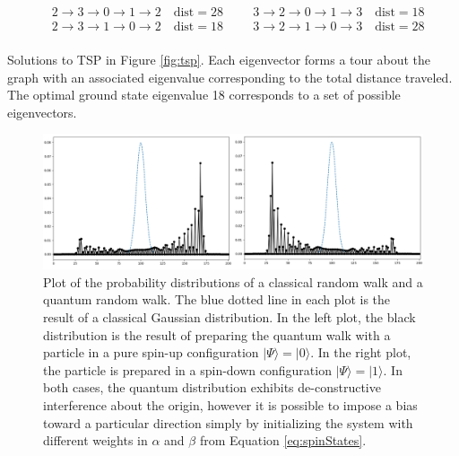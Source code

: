 \begin{table}[h]
\[\begin{split}
			&2 \rightarrow 3 \rightarrow 0 \rightarrow 1 \rightarrow 2 \quad \text{dist}=28 \hspace{1cm} 3 \rightarrow 2 \rightarrow 0 \rightarrow 1 \rightarrow 3 \quad \text{dist}=18\\
			&2 \rightarrow 3 \rightarrow 1 \rightarrow 0 \rightarrow 2 \quad \text{dist}=18 \hspace{1cm} 3 \rightarrow 2 \rightarrow 1 \rightarrow 0 \rightarrow 3 \quad \text{dist}=28\\
		\end{split}
		\]
		\caption{\doublespacing Solutions to TSP in Figure \ref{fig:tsp}. 
			Each eigenvector forms a tour about the graph with an associated eigenvalue corresponding to the total distance traveled. 
			The optimal ground state eigenvalue 18 corresponds to a set of possible eigenvectors.}
		\label{tab:eigenset}
	\end{table}
\vspace{-0.5cm}
		\begin{figure}[H]
				\includegraphics[width=16cm]{images/bias}
			\caption{\doublespacing Plot of the probability distributions of a classical random walk and a quantum random walk. 
				The blue dotted line in each plot is the result of a classical Gaussian distribution. 
				In the left plot, the black distribution is the result of preparing the quantum walk with a particle in a pure spin-up configuration $|\Psi\rangle = |0\rangle$. 
				In the right plot, the particle is prepared in a spin-down configuration $|\Psi\rangle = |1\rangle$. 
				In both cases, the quantum distribution exhibits de-constructive interference about the origin, however it is possible to impose a bias toward a particular direction simply by initializing the system with different weights in $\alpha$ and $\beta$ from Equation \ref{eq:spinStates}.}
			\label{fig:biasWalk}
		\end{figure}

